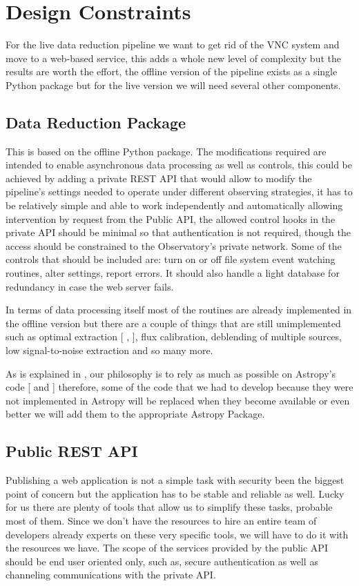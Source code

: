 \documentclass[11pt,twoside]{article}
\begin{document}
\section{Design Constraints}

For the live data reduction pipeline we want to get rid of the VNC system and move to a web-based service, this adds a whole new level of complexity but the results are worth the effort, the offline version of the pipeline exists as a single Python package but for the live version  we will need several other components.

\subsection{Data Reduction Package}

This is based on the offline Python package. The modifications required are intended to enable asynchronous data processing as well as controls, this could be achieved by adding a private REST API that would allow to modify the pipeline's settings needed to operate under different observing strategies, it has to be relatively simple and able to work independently and automatically allowing intervention by request from the Public API, the allowed control hooks in the private API should be minimal so that authentication is not required, though the access should be constrained to the Observatory's private network. Some of the controls that should be included are: turn on or off file system event watching routines, alter settings, report errors. It should also handle a light database for redundancy in case the web server fails.

In terms of data processing itself most of the routines are already implemented in the offline version but there are a couple of things that are still unimplemented such as optimal extraction [ \citet{1989PASP..101.1032M},  \citet{1986PASP...98..609H} ], flux calibration, deblending of multiple sources, low signal-to-noise extraction and so many more.

As is explained in \citet{P9-115_adassxxvii}, our philosophy is to rely as much as possible on Astropy's code   [ \citet{2013A&A...558A..33A} and \citet{2018AJ....156..123A} ] therefore, some of the code that we had to develop because they were not implemented in Astropy will be replaced when they become available or even better we will add them to the appropriate Astropy Package.

\subsection{Public REST API}
Publishing a web application is not a simple task with security been the biggest point of concern but the application has to be stable and reliable as well. Lucky for us there are plenty of tools that allow us to simplify these tasks, probable most of them. Since we don't have the resources to hire an entire team of developers already experts on these very specific tools, we will have to do it with the resources we have. The scope of the services provided by the public API should be end user oriented only, such as, secure authentication as well as channeling communications with the private API.
\end{document}

